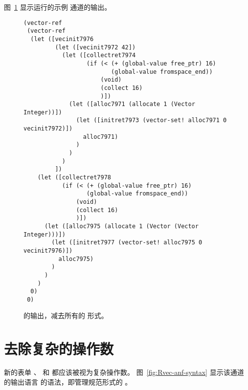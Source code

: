 \documentclass[11pt]{book}
\begin{document}
图~\ref{fig:expose-alloc-output} 显示运行的示例  通道的输出。

\begin{figure}[tbp]
\begin{lstlisting}
(vector-ref
 (vector-ref
  (let ([vecinit7976
         (let ([vecinit7972 42])
           (let ([collectret7974
                  (if (< (+ (global-value free_ptr) 16) 
                         (global-value fromspace_end))
                      (void)
                      (collect 16)
                      )])
             (let ([alloc7971 (allocate 1 (Vector Integer))])
               (let ([initret7973 (vector-set! alloc7971 0 vecinit7972)])
                 alloc7971)
               )
             )
           )
         ])
    (let ([collectret7978
           (if (< (+ (global-value free_ptr) 16)
                  (global-value fromspace_end))
               (void)
               (collect 16)
               )])
      (let ([alloc7975 (allocate 1 (Vector (Vector Integer)))])
        (let ([initret7977 (vector-set! alloc7975 0 vecinit7976)])
          alloc7975)
        )
      )
    )
  0)
 0)
\end{lstlisting}
\caption{  的输出，减去所有的  形式。}
\label{fig:expose-alloc-output}
\end{figure}


\section{去除复杂的操作数}
\label{sec:remove-complex-opera-Rvec}

新的表单  、  和 
都应该被视为复杂操作数。
图~\ref{fig:Rvec-anf-syntax}
显示该通道的输出语言 \LangVecANF{} 的语法，即管理规范形式的 \LangVec{} 。
\end{document}
